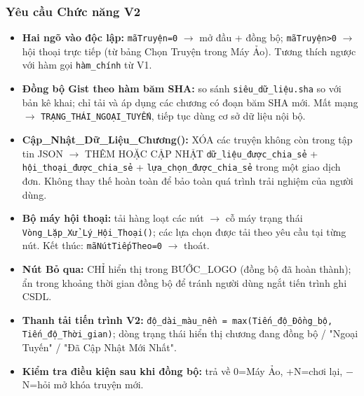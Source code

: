 \documentclass[12pt,a4paper]{article}
\begin{document}
\subsubsection{Yêu cầu Chức năng V2}
\begin{itemize}[leftmargin=*]
    \item \textbf{Hai ngõ vào độc lập:} \texttt{mãTruyện=0} $\rightarrow$ mở đầu + đồng bộ;
    \texttt{mãTruyện>0} $\rightarrow$ hội thoại trực tiếp (từ bảng Chọn Truyện trong Máy Ảo). Tương thích ngược với hàm gọi \texttt{hàm\_chính} từ V1.
    \item \textbf{Đồng bộ Gist theo hàm băm SHA:} so sánh \texttt{siêu\_dữ\_liệu.sha} so với bản kê khai; chỉ tải và áp dụng các chương có đoạn băm SHA mới.
    Mất mạng $\rightarrow$ \texttt{TRẠNG\_THÁI\_NGOẠI\_TUYẾN}, tiếp tục dùng cơ sở dữ liệu nội bộ.
    \item \textbf{Cập\_Nhật\_Dữ\_Liệu\_Chương():} XÓA các truyện không còn trong tập tin JSON $\rightarrow$ THÊM HOẶC CẬP NHẬT \texttt{dữ\_liệu\_được\_chia\_sẻ} + \allowbreak\texttt{hội\_thoại\_được\_chia\_sẻ} + \allowbreak\texttt{lựa\_chọn\_được\_chia\_sẻ} trong một giao dịch đơn.
    Không thay thế hoàn toàn để bảo toàn quá trình trải nghiệm của người dùng.
    \item \textbf{Bộ máy hội thoại:} tải hàng loạt các nút $\rightarrow$ cỗ máy trạng thái \texttt{Vòng\_Lặp\_Xử\_Lý\_Hội\_Thoại()};
    các lựa chọn được tải theo yêu cầu tại từng nút. Kết thúc: \texttt{mãNútTiếpTheo=0} $\rightarrow$ thoát.
    \item \textbf{Nút Bỏ qua:} CHỈ hiển thị trong BƯỚC\_LOGO (đồng bộ đã hoàn thành);
    ẩn trong khoảng thời gian đồng bộ để tránh người dùng ngắt tiến trình ghi CSDL.
    \item \textbf{Thanh tải tiến trình V2:} \texttt{độ\_dài\_màu\_nền = max(Tiến\_độ\_Đồng\_bộ, Tiến\_độ\_Thời\_gian)};
    dòng trạng thái hiển thị chương đang đồng bộ / "Ngoại Tuyến" / "Đã Cập Nhật Mới Nhất".
    \item \textbf{Kiểm tra điều kiện sau khi đồng bộ:} trả về 0=Máy Ảo, +N=chơi lại, $-$N=hỏi mở khóa truyện mới.
\end{itemize}
\end{document}

